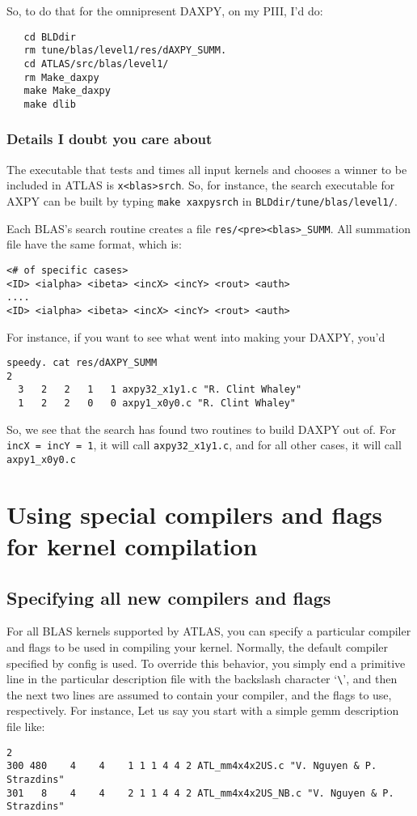 \documentclass[11pt]{article}
\begin{document}
So, to do that for the omnipresent DAXPY, on my PIII, I'd do:
\begin{verbatim}
   cd BLDdir
   rm tune/blas/level1/res/dAXPY_SUMM.
   cd ATLAS/src/blas/level1/
   rm Make_daxpy
   make Make_daxpy
   make dlib
\end{verbatim}

\subsubsection{Details I doubt you care about}
The executable that tests and times all input kernels and chooses a winner
to be included in ATLAS is {\tt x<blas>srch}.  So, for instance, the
search executable for AXPY can be built by typing
{\tt make xaxpysrch} in {\tt BLDdir/tune/blas/level1/}.

Each BLAS's search routine creates a file {\tt res/<pre><blas>\_SUMM}.
All summation file have the same format, which is:
\begin{verbatim}
<# of specific cases>
<ID> <ialpha> <ibeta> <incX> <incY> <rout> <auth>
....
<ID> <ialpha> <ibeta> <incX> <incY> <rout> <auth>
\end{verbatim}

For instance, if you want to see what went into making your DAXPY, you'd
\begin{verbatim}
speedy. cat res/dAXPY_SUMM 
2
  3   2   2   1   1 axpy32_x1y1.c "R. Clint Whaley"
  1   2   2   0   0 axpy1_x0y0.c "R. Clint Whaley"
\end{verbatim}

So, we see that the search has found two routines to build DAXPY out of.
For {\tt incX = incY = 1}, it will call {\tt axpy32\_x1y1.c}, and for
all other cases, it will call {\tt axpy1\_x0y0.c}

\section{Using special compilers and flags for kernel compilation}

\subsection{Specifying all new compilers and flags}
For all BLAS kernels supported by ATLAS, you can specify a particular
compiler and flags to be used in compiling your kernel.  Normally, the
default compiler specified by config is used.  To override this behavior,
you simply end a primitive line in the particular description file with
the backslash character `\verb+\+', and then the next two lines are
assumed to contain your compiler, and the flags to use, respectively.
For instance, Let us say you start with a simple gemm description file like:
\begin{verbatim}
2
300 480    4    4    1 1 1 4 4 2 ATL_mm4x4x2US.c "V. Nguyen & P. Strazdins" 
301   8    4    4    2 1 1 4 4 2 ATL_mm4x4x2US_NB.c "V. Nguyen & P. Strazdins"
\end{verbatim}
\end{document}
